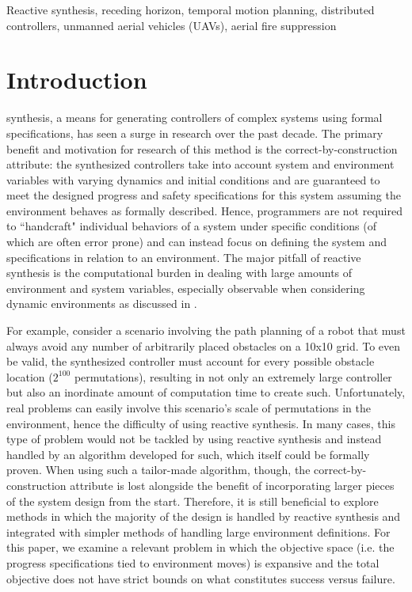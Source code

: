 \documentclass{ieeeaccess}
\begin{document}
\begin{keywords}
Reactive synthesis, receding horizon, temporal motion planning, distributed controllers, unmanned aerial vehicles (UAVs), aerial fire suppression
\end{keywords}

\titlepgskip=-15pt

\maketitle

\section{Introduction}
\label{sec:introduction}
 synthesis, a means for generating controllers of complex systems using formal specifications, has seen a surge in research over the past decade. The primary benefit and motivation for research of this method is the correct-by-construction attribute: the synthesized controllers take into account system and environment variables with varying dynamics and initial conditions and are guaranteed to meet the designed progress and safety specifications for this system assuming the environment behaves as formally described. Hence, programmers are not required to ``handcraft" individual behaviors of a system under specific conditions (of which are often error prone) and can instead focus on defining the system and specifications in relation to an environment. The major pitfall of reactive synthesis is the computational burden in dealing with large amounts of environment and system variables, especially observable when considering dynamic environments as discussed in \cite{c10}.

For example, consider a scenario involving the path planning of a robot that must always avoid any number of arbitrarily placed obstacles on a 10x10 grid. To even be valid, the synthesized controller must account for every possible obstacle location ($2^{100}$ permutations), resulting in not only an extremely large controller but also an inordinate amount of computation time to create such. Unfortunately, real problems can easily involve this scenario's scale of permutations in the environment, hence the difficulty of using reactive synthesis. In many cases, this type of problem would not be tackled by using reactive synthesis and instead handled by an algorithm developed for such, which itself could be formally proven. When using such a tailor-made algorithm, though, the correct-by-construction attribute is lost alongside the benefit of incorporating larger pieces of the system design from the start. Therefore, it is still beneficial to explore methods in which the majority of the design is handled by reactive synthesis and integrated with simpler methods of handling large environment definitions. For this paper, we examine a relevant problem in which the objective space (i.e. the progress specifications tied to environment moves) is expansive and the total objective does not have strict bounds on what constitutes success versus failure.
\end{document}
